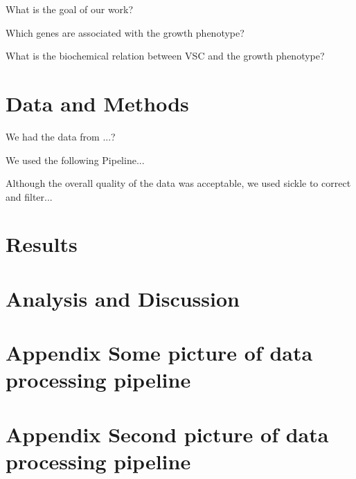 \documentclass[10pt,a4paper]{article}
\begin{document}
What is the goal of our work?

Which genes are associated with the growth phenotype?

What is the biochemical relation between VSC and the growth phenotype?


\section{Data and Methods}
We had the data from ...?

We used the following Pipeline...

Although the overall quality of the data was acceptable, we used sickle to correct and filter...

\section{Results}




\section{Analysis and Discussion}

\pagebreak
\appendix
\section{Appendix Some picture of data processing pipeline}
\section{Appendix Second picture of data processing pipeline}
\end{document}
